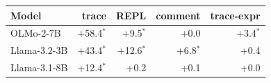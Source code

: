 \begin{tabular}{@{}lrrrr@{}}
\toprule
Model & trace & REPL & comment & trace-expr \\
\midrule
OLMo-2-7B & +58.4$^{*}$ & +9.5$^{*}$ & +0.0 & +3.4$^{*}$ \\
Llama-3.2-3B & +43.4$^{*}$ & +12.6$^{*}$ & +6.8$^{*}$ & +0.4 \\
Llama-3.1-8B & +12.4$^{*}$ & +0.2 & +0.1 & +0.0 \\
\bottomrule
\end{tabular}
